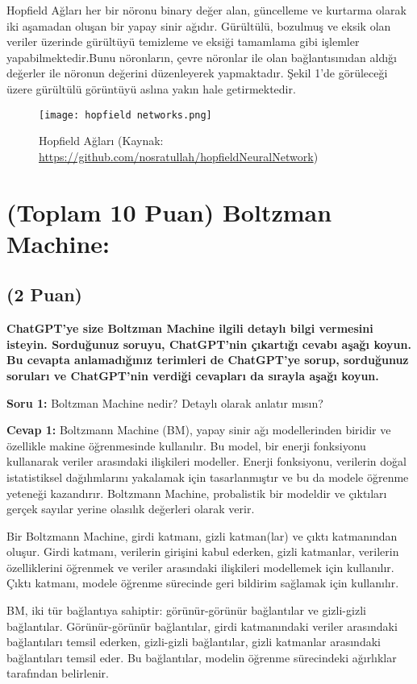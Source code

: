 \documentclass[11pt]{article}
\begin{document}
Hopfield Ağları her bir nöronu binary değer alan, güncelleme ve kurtarma olarak iki aşamadan oluşan bir yapay sinir ağıdır. Gürültülü, bozulmuş ve eksik olan veriler üzerinde gürültüyü temizleme ve eksiği tamamlama gibi işlemler yapabilmektedir.Bunu nöronların, çevre nöronlar ile olan bağlantısınıdan aldığı değerler ile nöronun değerini düzenleyerek yapmaktadır. Şekil 1'de görüleceği üzere gürültülü görüntüyü aslına yakın hale getirmektedir.
\begin{figure}[ht]
  \centering
  \shorthandoff{=}
  \texttt{[image: hopfield networks.png]}
  \shorthandoff{=}
  \caption[Şekil 1]{Hopfield Ağları (Kaynak: \url{https://github.com/nosratullah/hopfieldNeuralNetwork})}

\end{figure}
\newpage

\section{(Toplam 10 Puan) Boltzman Machine:}

\subsection{(2 Puan)} \textbf{ChatGPT’ye size Boltzman Machine ilgili detaylı bilgi vermesini isteyin. Sorduğunuz soruyu, ChatGPT'nin çıkartığı cevabı aşağı koyun. Bu cevapta anlamadığınız terimleri de ChatGPT’ye sorup, sorduğunuz soruları ve ChatGPT’nin verdiği cevapları da sırayla aşağı koyun.}

\textbf{Soru 1: } Boltzman Machine nedir? Detaylı olarak anlatır mısın?

\textbf{Cevap 1: } Boltzmann Machine (BM), yapay sinir ağı modellerinden biridir ve özellikle makine öğrenmesinde kullanılır. Bu model, bir enerji fonksiyonu kullanarak veriler arasındaki ilişkileri modeller. Enerji fonksiyonu, verilerin doğal istatistiksel dağılımlarını yakalamak için tasarlanmıştır ve bu da modele öğrenme yeteneği kazandırır. Boltzmann Machine, probalistik bir modeldir ve çıktıları gerçek sayılar yerine olasılık değerleri olarak verir.

Bir Boltzmann Machine, girdi katmanı, gizli katman(lar) ve çıktı katmanından oluşur. Girdi katmanı, verilerin girişini kabul ederken, gizli katmanlar, verilerin özelliklerini öğrenmek ve veriler arasındaki ilişkileri modellemek için kullanılır. Çıktı katmanı, modele öğrenme sürecinde geri bildirim sağlamak için kullanılır.

BM, iki tür bağlantıya sahiptir: görünür-görünür bağlantılar ve gizli-gizli bağlantılar. Görünür-görünür bağlantılar, girdi katmanındaki veriler arasındaki bağlantıları temsil ederken, gizli-gizli bağlantılar, gizli katmanlar arasındaki bağlantıları temsil eder. Bu bağlantılar, modelin öğrenme sürecindeki ağırlıklar tarafından belirlenir.
\end{document}
